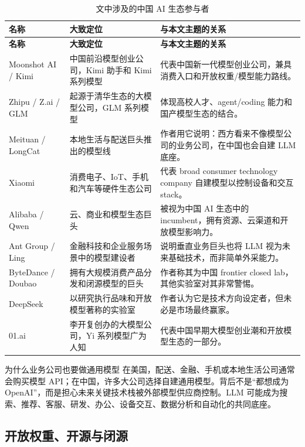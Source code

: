 \documentclass[a4paper]{article}
\begin{document}
\begin{longtable}{@{}p{3.2cm}p{4.4cm}p{6.2cm}@{}}
\caption{文中涉及的中国 AI 生态参与者}\\
\toprule
\textbf{名称} & \textbf{大致定位} & \textbf{与本文主题的关系} \\
\midrule
\endfirsthead
\toprule
\textbf{名称} & \textbf{大致定位} & \textbf{与本文主题的关系} \\
\midrule
\endhead
Moonshot AI / Kimi & 中国前沿模型创业公司，Kimi 助手和 Kimi 系列模型 & 代表中国新一代模型创业公司，兼具消费入口和开放权重/模型能力路线。 \\
\addlinespace
Zhipu / Z.ai / GLM & 起源于清华生态的大模型公司，GLM 系列模型 & 体现高校人才、agent/coding 能力和国产模型生态的结合。 \\
\addlinespace
Meituan / LongCat & 本地生活与配送巨头推出的模型线 & 作者用它说明：西方看来不像模型公司的业务公司，在中国也会自建 LLM 底座。 \\
\addlinespace
Xiaomi & 消费电子、IoT、手机和汽车等硬件生态公司 & 代表 broad consumer technology company 自建模型以控制设备和交互 stack。 \\
\addlinespace
Alibaba / Qwen & 云、商业和模型生态巨头 & 被视为中国 AI 生态中的 incumbent，拥有资源、云渠道和开放模型影响力。 \\
\addlinespace
Ant Group / Ling & 金融科技和企业服务场景中的模型建设者 & 说明垂直业务巨头也将 LLM 视为未来基础技术，而非简单外采能力。 \\
\addlinespace
ByteDance / Doubao & 拥有大规模消费产品分发和闭源模型的巨头 & 作者称其为中国 frontier closed lab，其他实验室对其非常警惕。 \\
\addlinespace
DeepSeek & 以研究执行品味和开放模型著称的实验室 & 作者认为它是技术方向设定者，但未必是市场最终赢家。 \\
\addlinespace
01.ai & 李开复创办的大模型公司，Yi 系列模型广为人知 & 代表中国早期大模型创业潮和开放模型生态的一部分。 \\
\bottomrule
\end{longtable}

\begin{knowledgebox}{为什么业务公司也要做通用模型}
在美国，配送、金融、手机或本地生活公司通常会购买模型 API；在中国，许多大公司选择自建通用模型。背后不是``都想成为 OpenAI''，而是担心未来关键技术栈被外部模型供应商控制。LLM 可能成为搜索、推荐、客服、研发、办公、设备交互、数据分析和自动化的共同底座。
\end{knowledgebox}

\subsection{开放权重、开源与闭源}
\end{document}
